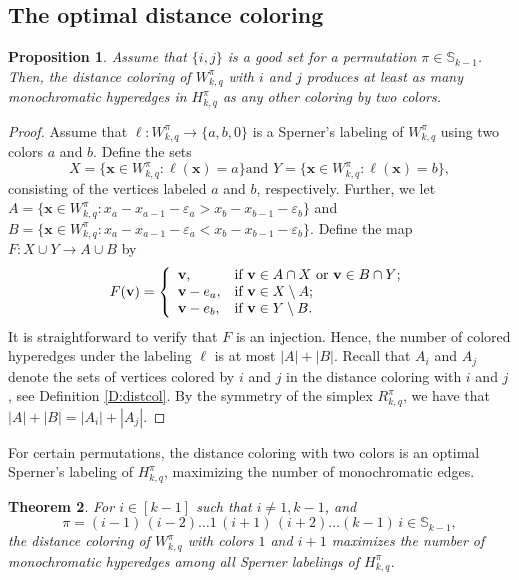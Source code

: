 \documentclass{birkjour}
\newtheorem{thm}{Theorem}[section]
\newtheorem{prop}[thm]{Proposition}
\theoremstyle{definition}
\theoremstyle{remark}
\numberwithin{equation}{section}
\begin{document}
\subsection{The optimal distance coloring}
\begin{prop} Assume that $\{i,j\}$ is a good set for a
permutation $\pi\in \mathbb{S}_{k-1}$. Then, the distance coloring
of $W^\pi_{k,q}$ with $i$ and $j$ produces at least as many
monochromatic hyperedges in $H^\pi_{k,q }$ as any other coloring
by two colors.
\end{prop}
\begin{proof}
Assume that $\ell :W^\pi_{k,q}\rightarrow \{a,b,0\}$ is a Sperner's
labeling of $W^\pi_{k,q}$ using two colors $a$ and $b$. Define the sets
$$X=\{\mathbf{x}\in W^\pi_{k,q} :\ell(\mathbf{x})=a\} \textrm{
and } Y=\{\mathbf{x}\in W^\pi_{k,q} :\ell(\mathbf{x})=b\},$$
consisting of the vertices labeled $a$ and $b$, respectively.
Further, we let\\ $A=\{\mathbf{x}\in W^\pi_{k,q}
:x_a-x_{a-1}-\varepsilon_a
>x_b-x_{b-1}-\varepsilon_b\}$ and $B=\{\mathbf{x}\in W^\pi_{k,q}
:x_a-x_{a-1}-\varepsilon_a <x_b-x_{b-1}-\varepsilon_b\}$. Define
the map $F:X\cup Y \rightarrow A\cup B$ by
$$F(\mathbf{v})=\left\{%
\begin{array}{ll}
    \mathbf{v}, & \hbox{if $\mathbf{v}\in A\cap X$
    or $\mathbf{v}\in B\cap Y$;} \\
    \mathbf{v}-e_a, & \hbox{if $\mathbf{v}\in X\setminus A$;} \\
     \mathbf{v}-e_b, & \hbox{if $\mathbf{v}\in Y\setminus B$.} \\
\end{array}%
\right.    $$ It is straightforward to verify that $F$ is an
injection. Hence, the number of colored hyperedges under the
labeling $\ell$ is at most $|A|+|B|$. Recall that $A_i$ and $A_j$
denote the sets of vertices colored by $i$ and $j$ in the distance
coloring with $i$ and $j$, see Definition \ref{D:distcol}. By the symmetry of the
simplex $R^\pi_{k,q}$, we have that $|A|+|B|=|A_i|+|A_j|$.
\end{proof}
For certain permutations, the distance coloring with two colors is
an optimal Sperner's labeling of $H^\pi_{k,q}$, maximizing the
number of monochromatic edges.
\begin{thm}For $i\in[k-1]$ such that $i\ne 1, k-1$,
and  $$\pi=(i-1)\, (i-2)\ldots 1\,  (i+1)\, (i+2)\ldots (k-1)\,
i\in \mathbb{S}_{k-1},$$ the distance coloring of $W^{\pi}_{k,q}$
with colors $1$ and $i+1$ maximizes the number of monochromatic
hyperedges among all Sperner labelings of $H^\pi_{k,q}$.
\end{thm}
\end{document}
